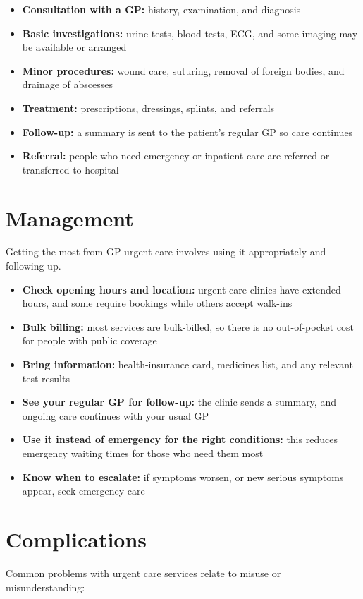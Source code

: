 \begin{itemize}
    \item \textbf{Consultation with a GP:} history, examination, and diagnosis
    \item \textbf{Basic investigations:} urine tests, blood tests, ECG, and some imaging may be available or arranged
    \item \textbf{Minor procedures:} wound care, suturing, removal of foreign bodies, and drainage of abscesses
    \item \textbf{Treatment:} prescriptions, dressings, splints, and referrals
    \item \textbf{Follow-up:} a summary is sent to the patient's regular GP so care continues
    \item \textbf{Referral:} people who need emergency or inpatient care are referred or transferred to hospital
\end{itemize}

\section*{Management}
Getting the most from GP urgent care involves using it appropriately and following up.

\begin{itemize}
    \item \textbf{Check opening hours and location:} urgent care clinics have extended hours, and some require bookings while others accept walk-ins
    \item \textbf{Bulk billing:} most services are bulk-billed, so there is no out-of-pocket cost for people with public coverage
    \item \textbf{Bring information:} health-insurance card, medicines list, and any relevant test results
    \item \textbf{See your regular GP for follow-up:} the clinic sends a summary, and ongoing care continues with your usual GP
    \item \textbf{Use it instead of emergency for the right conditions:} this reduces emergency waiting times for those who need them most
    \item \textbf{Know when to escalate:} if symptoms worsen, or new serious symptoms appear, seek emergency care
\end{itemize}

\section*{Complications}
Common problems with urgent care services relate to misuse or misunderstanding:

